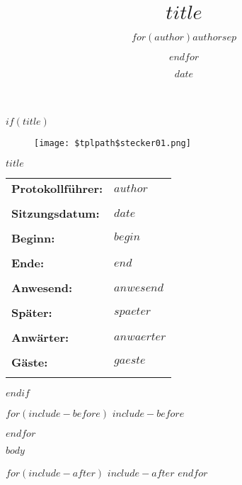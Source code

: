 \documentclass[a4paper,12pt,ngerman,titlepage,oneside]{$documentclass$}
\title{$title$}
\author{$for(author)$$author$$sep$ \and $endfor$}
\date{$date$}
\begin{document}
$if(title)$
	\thispagestyle{empty}
	\begin{titlepage}
		\thispagestyle{empty}
		\normalfont

        \vfill
        \begin{figure}[ht]
	       \centering
           \texttt{[image: \$tplpath\$stecker01.png]}
        \end{figure}
        \vfill
		\begin{center}
			\LARGE
			\textbf{$title$}
            \par
		\end{center}
		\vfill

		\begin{table}[htb]
		\begin{tabular}{lp{10cm}}
			\textbf{Protokollführer:} & $author$\\\\
            \textbf{Sitzungsdatum:} & $date$\\\\
            \textbf{Beginn:} & $begin$\\\\
            \textbf{Ende:} & $end$\\\\
            \textbf{Anwesend:} & $anwesend$\\\\
            \textbf{Später:} & $spaeter$\\\\
            \textbf{Anwärter:} & $anwaerter$\\\\
            \textbf{Gäste:} & $gaeste$\\\\
		\end{tabular}
		\end{table}

	\vfill
\end{titlepage}
\clearpage
$endif$

$for(include-before)$
$include-before$

$endfor$

{
\hypersetup{linkcolor=black}
\setcounter{tocdepth}{$toc-depth$}
\clearpage
}

$body$

$for(include-after)$
$include-after$
$endfor$
\end{document}
